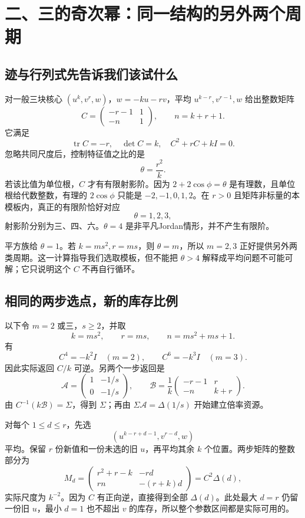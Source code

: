 \chapter{二、三的奇次幂：同一结构的另外两个周期}\label{ch:twothree}
\section{迹与行列式先告诉我们该试什么}
对一般三块核心 $(u^k,v^r,w)$，$w=-ku-rv$，平均 $u^{k-r},v^{r-1},w$ 给出整数矩阵
\[C=\begin{pmatrix}-r-1&1\\-n&1\end{pmatrix},
\qquad n=k+r+1.
\]
它满足
\[\operatorname{tr}C=-r,\quad\det C=k,\quad C^2+rC+kI=0.
\]
忽略共同尺度后，控制特征值之比的是
\[\theta=\frac{r^2}{k}.
\]
若该比值为单位根，$C$ 才有有限射影阶。因为 $2+2\cos\phi=\theta$ 是有理数，且单位根给代数整数，有理的 $2\cos\phi$ 只能是 $-2,-1,0,1,2$。在 $r>0$ 且矩阵非标量的本模板内，真正的有限阶恰好对应
\[\theta=1,2,3,
\]
射影阶分别为三、四、六。$\theta=4$ 是非平凡Jordan情形，并不产生有限阶。

平方族给 $\theta=1$。若 $k=ms^2,r=ms$，则 $\theta=m$，所以 $m=2,3$ 正好提供另外两类周期。这一计算指导我们选取模板，但不能把 $\theta>4$ 解释成平均问题不可能可解；它只说明这个 $C$ 不再自行循环。

\section{相同的两步选点，新的库存比例}
以下令 $m=2$ 或三，$s\ge2$，并取
\[k=ms^2,\qquad r=ms,\qquad n=ms^2+ms+1.
\]
有
\[C^4=-k^2I\quad(m=2),\qquad C^6=-k^3I\quad(m=3).
\]
因此实际返回 $C/k$ 可逆。另两个一步返回是
\[
\mathcal A=\begin{pmatrix}1&-1/s\\0&-1/s\end{pmatrix},\qquad
\mathcal B=\frac1k\begin{pmatrix}-r-1&r\\-n&k+r\end{pmatrix}.
\]
由 $C^{-1}(k\mathcal B)=\Sigma$，得到 $\Sigma$；再由 $\Sigma\mathcal A=\Delta(1/s)$ 开始建立倍率资源。

对每个 $1\le d\le r$，先选
\[(u^{k-r+d-1},v^{r-d},w)
\]
平均。保留 $r$ 份新值和一份未选的旧 $u$，再平均其余 $k$ 个位置。两步矩阵的整数部分为
\[
M_d=\begin{pmatrix}
r^2+r-k&-rd\\rn&-(r+k)d
\end{pmatrix}=C^2\Delta(d),
\]
实际尺度为 $k^{-2}$。因为 $C$ 有正向逆，直接得到全部 $\Delta(d)$。此处最大 $d=r$ 仍留一份旧 $u$，最小 $d=1$ 也不超出 $v$ 的库存，所以整个参数区间都是实际可用的。

